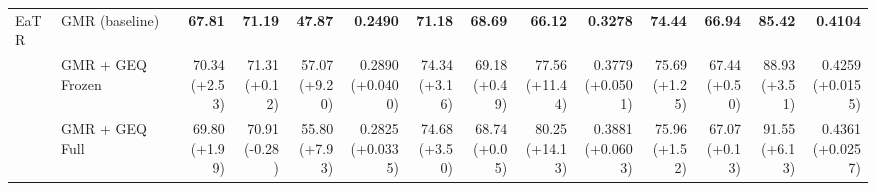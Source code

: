 \documentclass{article}
\begin{document}
{\begin{tabular}{llrrrrrrrrrrrr}
\midrule
EaTR & GMR (baseline) & \textbf{67.81} & \textbf{71.19} & \textbf{47.87} & \textbf{0.2490} & \textbf{71.18} & \textbf{68.69} & \textbf{66.12} & \textbf{0.3278} & \textbf{74.44} & \textbf{66.94} & \textbf{85.42} & \textbf{0.4104} \\
 & GMR + GEQ Frozen & \shortstack{70.34 \\ {\scriptsize\textcolor{Gain}{(+2.53)}}} & \shortstack{71.31 \\ {\scriptsize\textcolor{Gain}{(+0.12)}}} & \shortstack{57.07 \\ {\scriptsize\textcolor{Gain}{(+9.20)}}} & \shortstack{0.2890 \\ {\scriptsize\textcolor{Gain}{(+0.0400)}}} & \shortstack{74.34 \\ {\scriptsize\textcolor{Gain}{(+3.16)}}} & \shortstack{69.18 \\ {\scriptsize\textcolor{Gain}{(+0.49)}}} & \shortstack{77.56 \\ {\scriptsize\textcolor{Gain}{(+11.44)}}} & \shortstack{0.3779 \\ {\scriptsize\textcolor{Gain}{(+0.0501)}}} & \shortstack{75.69 \\ {\scriptsize\textcolor{Gain}{(+1.25)}}} & \shortstack{67.44 \\ {\scriptsize\textcolor{Gain}{(+0.50)}}} & \shortstack{88.93 \\ {\scriptsize\textcolor{Gain}{(+3.51)}}} & \shortstack{0.4259 \\ {\scriptsize\textcolor{Gain}{(+0.0155)}}} \\
 & GMR + GEQ Full & \shortstack{69.80 \\ {\scriptsize\textcolor{Gain}{(+1.99)}}} & \shortstack{70.91 \\ {\scriptsize\textcolor{Loss}{(-0.28)}}} & \shortstack{55.80 \\ {\scriptsize\textcolor{Gain}{(+7.93)}}} & \shortstack{0.2825 \\ {\scriptsize\textcolor{Gain}{(+0.0335)}}} & \shortstack{74.68 \\ {\scriptsize\textcolor{Gain}{(+3.50)}}} & \shortstack{68.74 \\ {\scriptsize\textcolor{Gain}{(+0.05)}}} & \shortstack{80.25 \\ {\scriptsize\textcolor{Gain}{(+14.13)}}} & \shortstack{0.3881 \\ {\scriptsize\textcolor{Gain}{(+0.0603)}}} & \shortstack{75.96 \\ {\scriptsize\textcolor{Gain}{(+1.52)}}} & \shortstack{67.07 \\ {\scriptsize\textcolor{Gain}{(+0.13)}}} & \shortstack{91.55 \\ {\scriptsize\textcolor{Gain}{(+6.13)}}} & \shortstack{0.4361 \\ {\scriptsize\textcolor{Gain}{(+0.0257)}}} \\

\end{tabular}}
\end{document}
